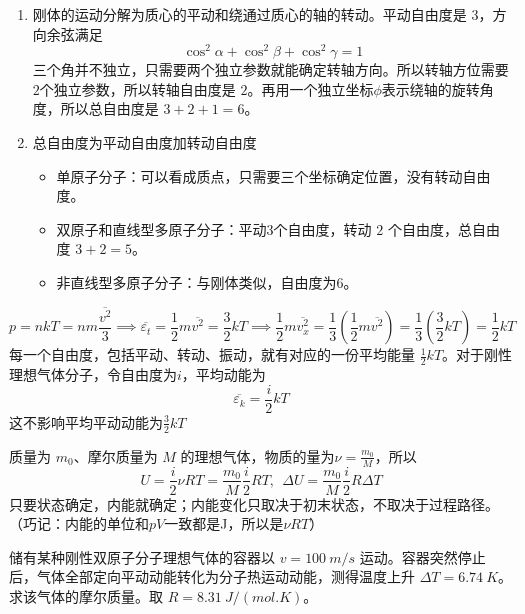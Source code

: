 \documentclass[lang=cn,11pt]{elegantbook}
\begin{document}
\begin{definition}
\begin{enumerate}
    \item 刚体的运动分解为质心的平动和绕通过质心的轴的转动。平动自由度是 \(3\)，方向余弦满足\[\cos^2\alpha+\cos^2\beta+\cos^2\gamma=1\]三个角并不独立，只需要两个独立参数就能确定转轴方向。所以转轴方位需要\(2\)个独立参数，所以转轴自由度是 \(2\)。再用一个独立坐标$\phi$表示绕轴的旋转角度，所以总自由度是 \(3+2+1=6\)。
    \item 总自由度为平动自由度加转动自由度
    \begin{itemize}
    \item 单原子分子：可以看成质点，只需要三个坐标确定位置，没有转动自由度。
    \item 双原子和直线型多原子分子：平动3个自由度，转动 \(2\) 个自由度，总自由度 \(3+2=5\)。
    \item 非直线型多原子分子：与刚体类似，自由度为6。
    \end{itemize}
\end{enumerate}
\end{definition}

\begin{theorem}[能量按自由度均分原理]
\[p=nkT=nm\frac{\overline{v^2}}{3}\implies \overline{\varepsilon_t}=\frac12m\overline{v^2}=\frac32kT\implies\frac12m\overline{v_x^2}=\frac13\left(\frac12m\overline{v^2}\right)=\frac13\left(\frac32kT\right)=\frac12kT\]每一个自由度，包括平动、转动、振动，就有对应的一份平均能量 \(\frac12kT\)。对于刚性理想气体分子，令自由度为$i$，平均动能为\[\overline{\varepsilon_k}=\frac{i}{2}kT\]这不影响平均平动动能为$\frac32kT$
\end{theorem}

\begin{definition}[理想气体的热力学能，内能]
    质量为 \(m_0\)、摩尔质量为 \(M\) 的理想气体，物质的量为\(\nu=\frac{m_0}{M}\)，所以\[U=\frac{i}{2}\nu RT=\frac{m_0}{M}\frac{i}{2}RT,~~\Delta U=\frac{m_0}{M}\frac{i}{2}R\Delta T\]只要状态确定，内能就确定；内能变化只取决于初末状态，不取决于过程路径。（巧记：内能的单位和$pV$一致都是J，所以是\(\nu RT\)）
\end{definition}



\begin{exercise}[由骤停温升反推刚性双原子气体摩尔质量]
储有某种刚性双原子分子理想气体的容器以 \(v=\SI{100}{m/s}\) 运动。容器突然停止后，气体全部定向平动动能转化为分子热运动动能，测得温度上升 \(\Delta T=\SI{6.74}{K}\)。求该气体的摩尔质量。取 \(R=\SI{8.31}{J/(mol.K)}\)。
\end{exercise}
\end{document}
